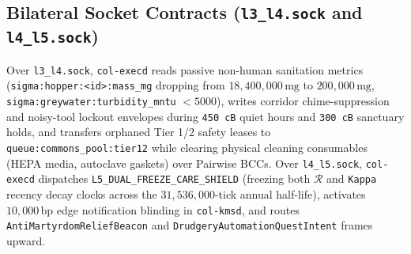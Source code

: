 \subsection{Bilateral Socket Contracts (\texttt{l3\_l4.sock} and \texttt{l4\_l5.sock})}

Over \texttt{l3\_l4.sock}, \texttt{col-execd} reads passive non-human sanitation metrics
(\texttt{sigma:hopper:<id>:mass\_mg} dropping from $18{,}400{,}000\,\mathrm{mg}$ to
$200{,}000\,\mathrm{mg}$, \texttt{sigma:greywater:turbidity\_mntu} $< 5000$), writes corridor
chime-suppression and noisy-tool lockout envelopes during \texttt{450 cB} quiet hours and
\texttt{300 cB} sanctuary holds, and transfers orphaned Tier 1/2 safety leases to
\texttt{queue:commons\_pool:tier12} while clearing physical cleaning consumables (HEPA media,
autoclave gaskets) over Pairwise BCCs. Over \texttt{l4\_l5.sock}, \texttt{col-execd} dispatches
\texttt{L5\_DUAL\_FREEZE\_CARE\_SHIELD} (freezing both $\mathcal{R}$ and \texttt{Kappa} recency decay
clocks across the $31{,}536{,}000$-tick annual half-life), activates $10{,}000\,\mathrm{bp}$ edge
notification blinding in \texttt{col-kmsd}, and routes \texttt{AntiMartyrdomReliefBeacon} and
\texttt{DrudgeryAutomationQuestIntent} frames upward.

